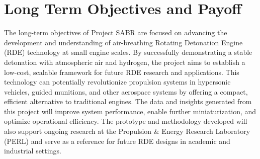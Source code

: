 \section*{Long Term Objectives and Payoff}

The long-term objectives of Project SABR are focused on advancing the development and understanding of air-breathing Rotating Detonation Engine (RDE) technology at small engine scales. By successfully demonstrating a stable detonation with atmospheric air and hydrogen, the project aims to establish a low-cost, scalable framework for future RDE research and applications. This technology can potentially revolutionize propulsion systems in hypersonic vehicles, guided munitions, and other aerospace systems by offering a compact, efficient alternative to traditional engines. The data and insights generated from this project will improve system performance, enable further miniaturization, and optimize operational efficiency. The prototype and methodology developed will also support ongoing research at the Propulsion \& Energy Research Laboratory (PERL) and serve as a reference for future RDE designs in academic and industrial settings.